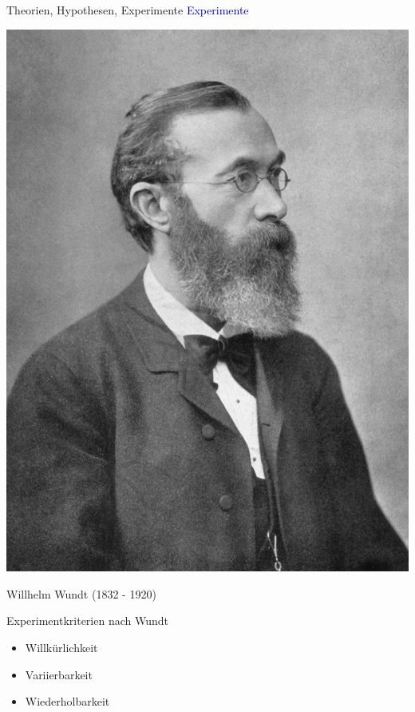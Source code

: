 \documentclass[
  8pt,
  ignorenonframetext,
]{beamer}
\begin{document}
\begin{frame}{Theorien, Hypothesen, Experimente}
\protect\hypertarget{theorien-hypothesen-experimente-6}{}
\textcolor{darkblue}{Experimente} \vspace{5mm} 

\begin{minipage}{.3\linewidth}
\begin{center}
\includegraphics[scale=1]{1_Abbildungen/pfm_1_wundt.jpg}

\footnotesize
Willhelm Wundt (1832 - 1920)

\end{center}
\end{minipage}
\hspace{7mm}
\begin{minipage}{.7\linewidth}
\vspace{-5mm}
\begin{large}
Experimentkriterien nach Wundt
\vspace{1mm}
\begin{itemize}
\itemsep2mm
\item Willkürlichkeit
\item Variierbarkeit
\item Wiederholbarkeit
\end{itemize}
\end{large}
\end{minipage}
\vspace{.7cm}
\end{frame}
\end{document}
